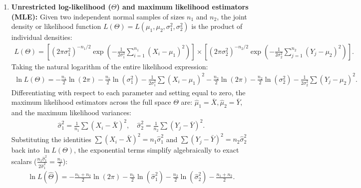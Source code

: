 \begin{solproblema}
	\begin{enumerate}
		\item \textbf{Unrestricted log-likelihood ($\Theta$) and maximum likelihood estimators (MLE):}
		Given two independent normal samples of sizes $n_1$ and $n_2$, the joint density or likelihood function $L(\Theta) = L(\mu_1, \mu_2, \sigma_1^2, \sigma_2^2)$ is the product of individual densities:
		\begin{align}
			L(\Theta) = \left[ (2\pi\sigma_1^2)^{-n_1/2} \exp\left(-\frac{1}{2\sigma_1^2}\sum_{i=1}^{n_1}(X_i - \mu_1)^2\right) \right] \times \left[ (2\pi\sigma_2^2)^{-n_2/2} \exp\left(-\frac{1}{2\sigma_2^2}\sum_{j=1}^{n_2}(Y_j - \mu_2)^2\right) \right].
		\end{align}
		Taking the natural logarithm of the entire likelihood expression:
		\begin{align}
			\ln L(\Theta) = -\frac{n_1}{2}\ln(2\pi) - \frac{n_1}{2}\ln(\sigma_1^2) - \frac{1}{2\sigma_1^2}\sum (X_i - \mu_1)^2 -\frac{n_2}{2}\ln(2\pi) - \frac{n_2}{2}\ln(\sigma_2^2) - \frac{1}{2\sigma_2^2}\sum (Y_j - \mu_2)^2.
		\end{align}
		Differentiating with respect to each parameter and setting equal to zero, the maximum likelihood estimators across the full space $\Theta$ are: $\hat{\mu}_1 = \bar{X}, \hat{\mu}_2 = \bar{Y}$, and the maximum likelihood variances:
		\begin{align}
			\hat{\sigma}_1^2 = \frac{1}{n_1}\sum (X_i - \bar{X})^2, \quad \hat{\sigma}_2^2 = \frac{1}{n_2}\sum (Y_j - \bar{Y})^2.
		\end{align}
		Substituting the identities $\sum(X_i - \bar{X})^2 = n_1\hat{\sigma}_1^2$ and $\sum(Y_j - \bar{Y})^2 = n_2\hat{\sigma}_2^2$ back into $\ln L(\Theta)$, the exponential terms simplify algebraically to exact scalars ($\frac{n_1\hat{\sigma}_1^2}{2\hat{\sigma}_1^2} = \frac{n_1}{2}$):
		\begin{align}
			\ln L(\hat{\Theta}) = -\frac{n_1 + n_2}{2}\ln(2\pi) - \frac{n_1}{2}\ln(\hat{\sigma}_1^2) - \frac{n_2}{2}\ln(\hat{\sigma}_2^2) - \frac{n_1 + n_2}{2}.
		\end{align}
		

\end{enumerate}
\end{solproblema}
